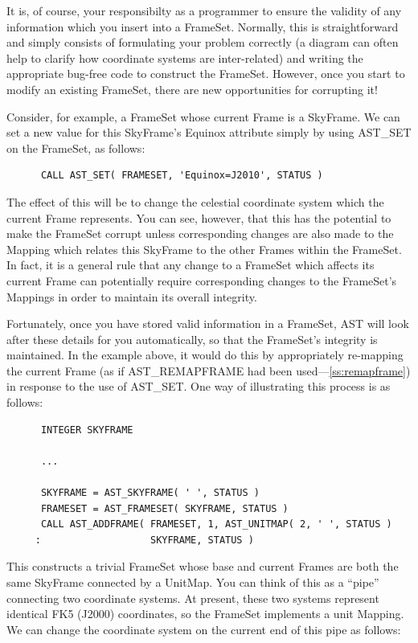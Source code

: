 \documentclass[twoside,11pt]{article}
\newcommand{\htmlref}[2]{#1}
\newcommand{\secref}[1]{\S\ref{#1}}
\renewcommand{\secref}[1]{\ref{#1}}
\begin{document}
It is, of course, your responsibilty as a programmer to ensure the
validity of any information which you insert into a
FrameSet. Normally, this is straightforward and simply consists of
formulating your problem correctly (a diagram can often help to
clarify how coordinate systems are inter-related) and writing the
appropriate bug-free code to construct the FrameSet. However, once you
start to modify an existing FrameSet, there are new opportunities for
corrupting it!

Consider, for example, a FrameSet whose current \htmlref{Frame}{Frame} is a
\htmlref{SkyFrame}{SkyFrame}. We can set a new value for this SkyFrame's \htmlref{Equinox}{Equinox} attribute
simply by using \htmlref{AST\_SET}{AST_SET} on the FrameSet, as follows:

\small
\begin{verbatim}
      CALL AST_SET( FRAMESET, 'Equinox=J2010', STATUS )
\end{verbatim}
\normalsize

The effect of this will be to change the celestial coordinate system
which the current Frame represents. You can see, however, that this
has the potential to make the FrameSet corrupt unless corresponding
changes are also made to the Mapping which relates this SkyFrame to
the other Frames within the FrameSet. In fact, it is a general rule
that any change to a FrameSet which affects its current Frame can
potentially require corresponding changes to the FrameSet's Mappings
in order to maintain its overall integrity.

Fortunately, once you have stored valid information in a FrameSet, AST
will look after these details for you automatically, so that the
FrameSet's integrity is maintained. In the example above, it would do
this by appropriately re-mapping the current Frame (as if
\htmlref{AST\_REMAPFRAME}{AST_REMAPFRAME} had been used---\secref{ss:remapframe}) in response to
the use of AST\_SET. One way of illustrating this process is as
follows:

\small
\begin{verbatim}
      INTEGER SKYFRAME

      ...

      SKYFRAME = AST_SKYFRAME( ' ', STATUS )
      FRAMESET = AST_FRAMESET( SKYFRAME, STATUS )
      CALL AST_ADDFRAME( FRAMESET, 1, AST_UNITMAP( 2, ' ', STATUS )
     :                   SKYFRAME, STATUS )
\end{verbatim}
\normalsize

This constructs a trivial FrameSet whose base and current Frames are
both the same SkyFrame connected by a \htmlref{UnitMap}{UnitMap}. You can think of this
as a ``pipe'' connecting two coordinate systems. At present, these two
systems represent identical FK5 (J2000) coordinates, so the FrameSet
implements a unit Mapping. We can change the coordinate system on the
current end of this pipe as follows:
\end{document}
